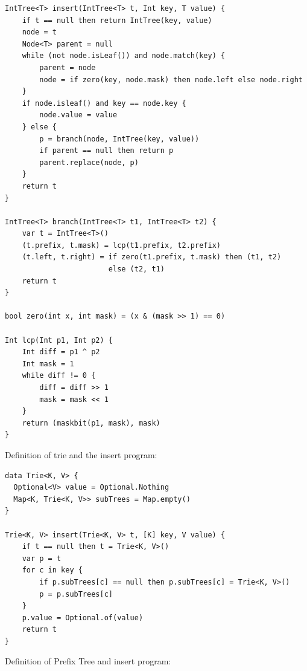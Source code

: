 \documentclass[b5paper]{article}
\begin{document}
\begin{lstlisting}[language = Bourbaki]
IntTree<T> insert(IntTree<T> t, Int key, T value) {
    if t == null then return IntTree(key, value)
    node = t
    Node<T> parent = null
    while (not node.isLeaf()) and node.match(key) {
        parent = node
        node = if zero(key, node.mask) then node.left else node.right
    }
    if node.isleaf() and key == node.key {
        node.value = value
    } else {
        p = branch(node, IntTree(key, value))
        if parent == null then return p
        parent.replace(node, p)
    }
    return t
}

IntTree<T> branch(IntTree<T> t1, IntTree<T> t2) {
    var t = IntTree<T>()
    (t.prefix, t.mask) = lcp(t1.prefix, t2.prefix)
    (t.left, t.right) = if zero(t1.prefix, t.mask) then (t1, t2)
                        else (t2, t1)
    return t
}

bool zero(int x, int mask) = (x & (mask >> 1) == 0)

Int lcp(Int p1, Int p2) {
    Int diff = p1 ^ p2
    Int mask = 1
    while diff != 0 {
        diff = diff >> 1
        mask = mask << 1
    }
    return (maskbit(p1, mask), mask)
}
\end{lstlisting}


Definition of trie and the insert program:

\begin{lstlisting}[language = Bourbaki]
data Trie<K, V> {
  Optional<V> value = Optional.Nothing
  Map<K, Trie<K, V>> subTrees = Map.empty()
}

Trie<K, V> insert(Trie<K, V> t, [K] key, V value) {
    if t == null then t = Trie<K, V>()
    var p = t
    for c in key {
        if p.subTrees[c] == null then p.subTrees[c] = Trie<K, V>()
        p = p.subTrees[c]
    }
    p.value = Optional.of(value)
    return t
}
\end{lstlisting}

Definition of Prefix Tree and insert program:
\end{document}
